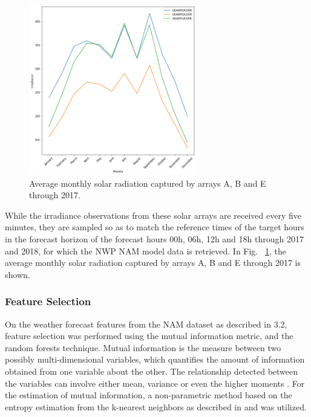 \begin{figure}[htbp]
    \begin{center}
    	\includegraphics[width=0.65\textwidth]{chapter3/fig_average_irradiance.png}
    	\caption[Average monthly solar radiation captured by arrays A, B and E through 2017.]{Average monthly solar radiation captured by arrays A, B and E through 2017.}
    	\label{fig:fig_average_irradiance}
    \end{center}
\end{figure}

While the irradiance observations from these solar arrays are received every five minutes, they are sampled so as to match the reference times of the target hours in the forecast horizon of the forecast hours 00h, 06h, 12h and 18h through 2017 and 2018, for which the NWP NAM model data is retrieved. In Fig. ~\ref{fig:fig_average_irradiance}, the average monthly solar radiation captured by arrays A, B and E through 2017 is shown.

\subsubsection*{Feature Selection}
On the weather forecast features from the NAM dataset as described in 3.2, feature selection was performed using the mutual information metric, and the random forests technique. Mutual information is the measure between two possibly multi-dimensional variables, which quantifies the amount of information obtained from one variable about the other. The relationship detected between the variables can involve either mean, variance or even the higher moments \cite{feature_selection_mi}. For the estimation of mutual information, a non-parametric method based on the entropy estimation from the k-nearest neighbors as described in \cite{feature_selection_mi} and \cite{feature_selection_mi2} was utilized. 

